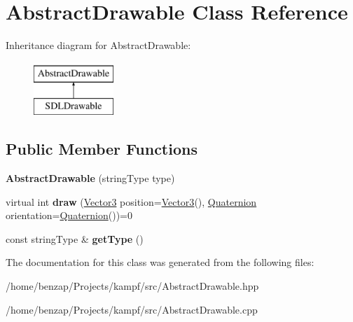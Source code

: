 \hypertarget{classAbstractDrawable}{\section{Abstract\-Drawable Class Reference}
\label{classAbstractDrawable}
}
Inheritance diagram for Abstract\-Drawable\-:\begin{figure}[H]
\begin{center}
\leavevmode
\includegraphics[height=2.000000cm]{classAbstractDrawable}
\end{center}
\end{figure}
\subsection*{Public Member Functions}
\begin{DoxyCompactItemize}
\item 
\hypertarget{classAbstractDrawable_af8e2e32f79d7aee95d3e798a9e32a9ef}{{\bfseries Abstract\-Drawable} (string\-Type type)}\label{classAbstractDrawable_af8e2e32f79d7aee95d3e798a9e32a9ef}

\item 
\hypertarget{classAbstractDrawable_a924e9b4e9efe301bd42b3159bcd82011}{virtual int {\bfseries draw} (\hyperlink{classVector3}{Vector3} position=\hyperlink{classVector3}{Vector3}(), \hyperlink{classQuaternion}{Quaternion} orientation=\hyperlink{classQuaternion}{Quaternion}())=0}\label{classAbstractDrawable_a924e9b4e9efe301bd42b3159bcd82011}

\item 
\hypertarget{classAbstractDrawable_a01de83e589b133728abf90138b6b298e}{const string\-Type \& {\bfseries get\-Type} ()}\label{classAbstractDrawable_a01de83e589b133728abf90138b6b298e}

\end{DoxyCompactItemize}


The documentation for this class was generated from the following files\-:\begin{DoxyCompactItemize}
\item 
/home/benzap/\-Projects/kampf/src/Abstract\-Drawable.\-hpp\item 
/home/benzap/\-Projects/kampf/src/Abstract\-Drawable.\-cpp\end{DoxyCompactItemize}
